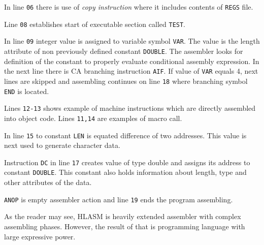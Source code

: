 In line \verb|06| there is use of \textit{copy instruction} where it includes contents of \verb|REGS| file.

Line \verb|08| establishes start of executable section called \verb|TEST|. 

In line \verb|09| integer value is assigned to variable symbol \verb|VAR|. The value is the length attribute of non previously defined constant \verb|DOUBLE|. The assembler looks for definition of the constant to properly evaluate conditional assembly expression. In the next line there is CA branching instruction \verb|AIF|. If value of \verb|VAR| equals 4, next lines are skipped and assembling continues on line \verb|18| where branching symbol \verb|END| is located.  

Lines \verb|12-13| shows example of machine instructions which are directly assembled into object code. Lines \verb|11,14| are examples of macro call.

In line \verb|15| to constant \verb|LEN| is equated difference of two addresses. This value is next used to generate character data.

Instruction \verb|DC| in line \verb|17| creates value of type double and assigns its address to constant \verb|DOUBLE|. This constant also holds information about length, type and other attributes of the data.  

\verb|ANOP| is empty assembler action and line \verb|19| ends the program assembling. 

\vspace{5mm}
As the reader may see, HLASM is heavily extended assembler with complex assembling phases. 
However, the result of that is programming language with large expressive power. 
